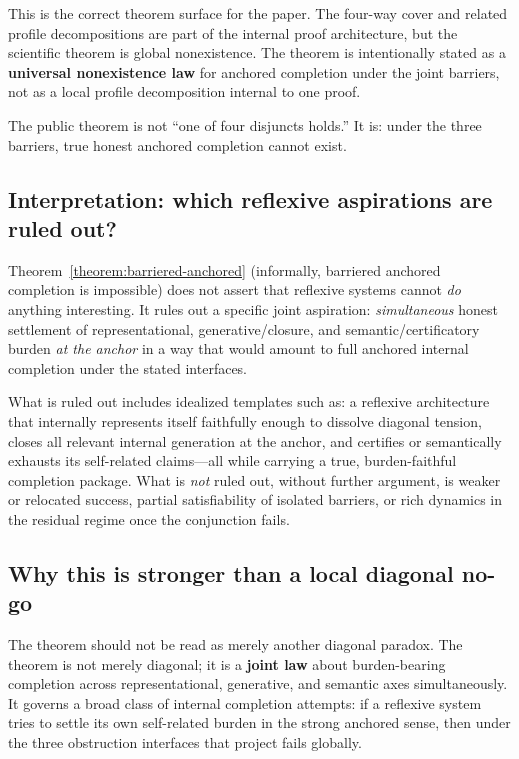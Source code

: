 \documentclass[11pt]{article}
\theoremstyle{plain}
\theoremstyle{definition}
\theoremstyle{remark}
\begin{document}
This is the correct theorem surface for the paper. The four-way cover and related profile decompositions are part of the internal proof architecture, but the scientific theorem is global nonexistence. The theorem is intentionally stated as a \textbf{universal nonexistence law} for anchored completion under the joint barriers, not as a local profile decomposition internal to one proof.

\begin{keybox}
The public theorem is not ``one of four disjuncts holds.'' It is: under the three barriers, true honest anchored completion cannot exist.
\end{keybox}

\subsection{Interpretation: which reflexive aspirations are ruled out?}

Theorem~\ref{theorem:barriered-anchored} (informally, barriered anchored completion is impossible) does not assert that reflexive systems cannot \emph{do} anything interesting. It rules out a specific joint aspiration: \emph{simultaneous} honest settlement of representational, generative/closure, and semantic/certificatory burden \emph{at the anchor} in a way that would amount to full anchored internal completion under the stated interfaces.

What is ruled out includes idealized templates such as: a reflexive architecture that internally represents itself faithfully enough to dissolve diagonal tension, closes all relevant internal generation at the anchor, and certifies or semantically exhausts its self-related claims---all while carrying a true, burden-faithful completion package. What is \emph{not} ruled out, without further argument, is weaker or relocated success, partial satisfiability of isolated barriers, or rich dynamics in the residual regime once the conjunction fails.

\subsection{Why this is stronger than a local diagonal no-go}

The theorem should not be read as merely another diagonal paradox. The theorem is not merely diagonal; it is a \textbf{joint law} about burden-bearing completion across representational, generative, and semantic axes simultaneously. It governs a broad class of internal completion attempts: if a reflexive system tries to settle its own self-related burden in the strong anchored sense, then under the three obstruction interfaces that project fails globally.
\end{document}
